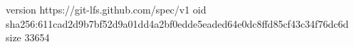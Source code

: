 version https://git-lfs.github.com/spec/v1
oid sha256:611cad2d9b7bf52d9a01dd4a2bf0edde5eaded64e0dc8ffd85cf43c34f76dc6d
size 33654
